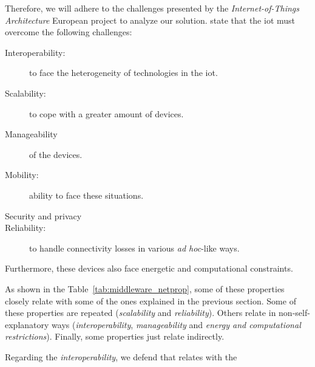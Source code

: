 Therefore, we will adhere to the challenges presented by the \emph{Internet-of-Things Architecture} European project \citep{walewski_project_2011} to analyze our solution.
\citeauthor{walewski_project_2011} state that the \ac{iot} must overcome the following challenges:
\begin{description}
  \item[Interoperability:] to face the heterogeneity of technologies in the \ac{iot}.
  \item[Scalability:] to cope with a greater amount of devices.
  \item[Manageability] of the devices.
  \item[Mobility:] ability to face these situations.
  \item[Security and privacy]
  \item[Reliability:] to handle connectivity losses in various \emph{ad hoc}-like ways.
\end{description}
Furthermore, these devices also face energetic and computational constraints.


As shown in the Table~\ref{tab:middleware_netprop}, some of these properties closely relate with some of the ones explained in the previous section.
Some of these properties are repeated (\emph{scalability} and \emph{reliability}).
Others relate in non-self-explanatory ways (\emph{interoperability}, \emph{manageability} and \emph{energy and computational restrictions}).
Finally, some properties just relate indirectly.

Regarding the \emph{interoperability}, we defend that relates with the 








